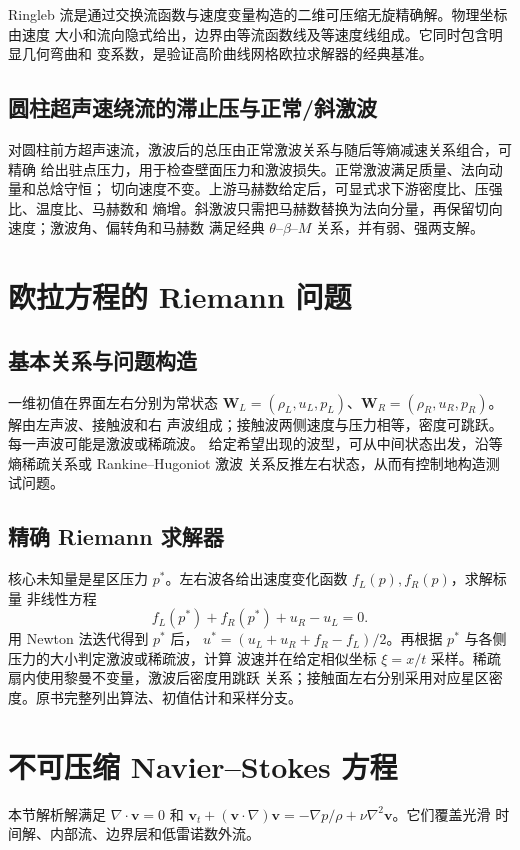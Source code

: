 \documentclass[11pt,a4paper,openany,fontset=none]{ctexbook}
\begin{document}
Ringleb 流是通过交换流函数与速度变量构造的二维可压缩无旋精确解。物理坐标由速度
大小和流向隐式给出，边界由等流函数线及等速度线组成。它同时包含明显几何弯曲和
变系数，是验证高阶曲线网格欧拉求解器的经典基准。

\subsection{圆柱超声速绕流的滞止压与正常/斜激波}
对圆柱前方超声速流，激波后的总压由正常激波关系与随后等熵减速关系组合，可精确
给出驻点压力，用于检查壁面压力和激波损失。正常激波满足质量、法向动量和总焓守恒；
切向速度不变。上游马赫数给定后，可显式求下游密度比、压强比、温度比、马赫数和
熵增。斜激波只需把马赫数替换为法向分量，再保留切向速度；激波角、偏转角和马赫数
满足经典 $\theta$--$\beta$--$M$ 关系，并有弱、强两支解。

\section{欧拉方程的 Riemann 问题}
\subsection{基本关系与问题构造}
一维初值在界面左右分别为常状态
$\bm W_L=(\rho_L,u_L,p_L)$、$\bm W_R=(\rho_R,u_R,p_R)$。解由左声波、接触波和右
声波组成；接触波两侧速度与压力相等，密度可跳跃。每一声波可能是激波或稀疏波。
给定希望出现的波型，可从中间状态出发，沿等熵稀疏关系或 Rankine--Hugoniot 激波
关系反推左右状态，从而有控制地构造测试问题。

\subsection{精确 Riemann 求解器}
核心未知量是星区压力 $p^*$。左右波各给出速度变化函数 $f_L(p),f_R(p)$，求解标量
非线性方程
\begin{equation}f_L(p^*)+f_R(p^*)+u_R-u_L=0.
\end{equation}
用 Newton 法迭代得到 $p^*$ 后，
$u^*=(u_L+u_R+f_R-f_L)/2$。再根据 $p^*$ 与各侧压力的大小判定激波或稀疏波，计算
波速并在给定相似坐标 $\xi=x/t$ 采样。稀疏扇内使用黎曼不变量，激波后密度用跳跃
关系；接触面左右分别采用对应星区密度。原书完整列出算法、初值估计和采样分支。

\section{不可压缩 Navier--Stokes 方程}
本节解析解满足 $\nabla\cdot\bm v=0$ 和
$\bm v_t+(\bm v\cdot\nabla)\bm v=-\nabla p/\rho+\nu\nabla^2\bm v$。它们覆盖光滑
时间解、内部流、边界层和低雷诺数外流。
\end{document}
